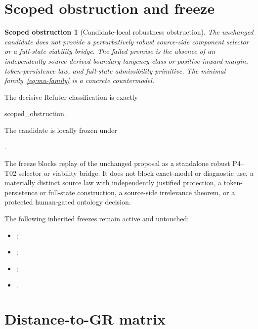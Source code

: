\documentclass[11pt]{article}
\newtheorem{obstruction}{Scoped obstruction}
\newcommand{\status}[1]{\textsf{#1}}
\begin{document}
\section{Scoped obstruction and freeze}

\begin{obstruction}[Candidate-local robustness obstruction]
The unchanged candidate does not provide a perturbatively robust source-side
component selector or a full-state viability bridge.  The failed premise is
the absence of an independently source-derived boundary-tangency class or
positive inward margin, token-persistence law, and full-state admissibility
primitive.  The minimal family~\eqref{eq:mu-family} is a concrete countermodel.
\end{obstruction}

The decisive Refuter classification is exactly
\begin{center}
\status{scoped\_obstruction}.
\end{center}
The candidate is locally frozen under
\begin{center}
.
\end{center}
The freeze blocks replay of the unchanged proposal as a standalone robust
P4--T02 selector or viability bridge.  It does not block exact-model or
diagnostic use, a materially distinct source law with independently justified
protection, a token-persistence or full-state construction, a source-side
irrelevance theorem, or a protected human-gated ontology decision.

The following inherited freezes remain active and untouched:
\begin{itemize}
 \item {};
 \item {};
 \item {};
 \item {}.
\end{itemize}

\section{Distance-to-GR matrix}
\end{document}
